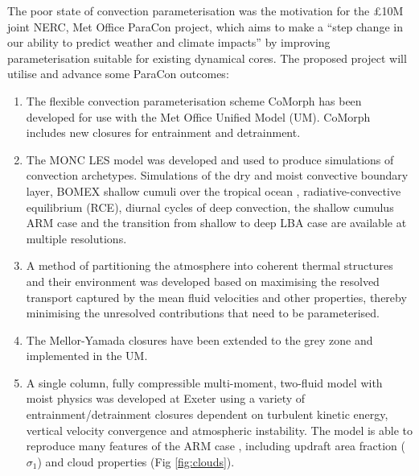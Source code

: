 \documentclass[11pt,a4paper]{article}
\begin{document}
The poor state of convection parameterisation was the motivation for the \pounds 10M joint NERC, Met Office ParaCon project, which aims to make a ``step change in our ability to predict weather and climate impacts'' by improving parameterisation suitable for existing dynamical cores. The proposed project will utilise and advance some ParaCon outcomes:
\begin{enumerate}
\item The flexible convection parameterisation scheme CoMorph has been developed for use with the Met Office Unified Model (UM). CoMorph includes new closures for entrainment and detrainment.

\item The MONC LES model was developed and used to produce simulations of convection archetypes. Simulations of the dry and moist convective boundary layer, BOMEX shallow cumuli over the tropical ocean \cite[]{HR73}, radiative-convective equilibrium (RCE), diurnal cycles of deep convection, the shallow cumulus ARM case \cite[]{BCC+02} and the transition from shallow to deep LBA case \cite[]{BFGB02} are available at multiple resolutions.

\item A method of partitioning the atmosphere into coherent thermal structures and their environment was developed \cite[]{ETB20} based on maximising the resolved transport captured by the mean fluid velocities and other properties, thereby minimising the unresolved contributions that need to be parameterised.

\item The Mellor-Yamada closures have been extended to the grey zone and implemented in the UM.

\item {\color{red} A single column, fully compressible multi-moment, two-fluid model with moist physics was developed at Exeter using a variety of entrainment/detrainment closures dependent on turbulent kinetic energy, vertical velocity convergence and atmospheric instability. The model is able to reproduce many features of the ARM case \cite[]{BCC+02}, including updraft area fraction ($\sigma_1$)  and cloud properties (Fig \ref{fig:clouds}). }


\end{enumerate}
\end{document}
